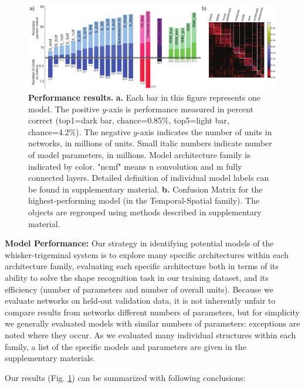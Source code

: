 \begin{figure}
\FigCenter
\includegraphics [width=\DefaultFigSize\linewidth]{figures/results.pdf}
\vspace{-3mm}
\caption{\footnotesize{\textbf{Performance results.} \textbf{a.} Each bar in this figure represents one model. The positive $y$-axis is performance measured in percent correct (top1=dark bar, chance=0.85\%, top5=light bar, chance=4.2\%).  The negative $y$-axis indicates the number of units in networks, in millions of units.  Small italic numbers indicate number of model parameters, in millions. Model architecture family is indicated by color. "ncmf" means n convolution and m fully connected layers. Detailed definition of individual model labels can be found in supplementary material. \textbf{b.} Confusion Matrix for the highest-performing model (in the Temporal-Spatial family). The objects are regrouped using methods described in supplementary material.}~\label{fig_main}}
\vspace{-5mm}
\end{figure}

\textbf{Model Performance:} 
Our strategy in identifying potential models of the whisker-trigeminal system is to explore many specific architectures within each architecture family, evaluating each specific architecture both in terms of its ability to solve the shape recognition task in our training dataset, and its efficiency (number of parameters and number of overall units).
Because we evaluate networks on held-out validation data, it is not inherently unfair to compare results from networks different numbers of parameters, but for simplicity we generally evaluated models with similar numbers of parameters: exceptions are noted where they occur.
As we evaluated many individual structures within each family, a list of the specific models and parameters are given in the supplementary materials.

Our results (Fig. \ref{fig_main}) can be summarized with following conclusions:

